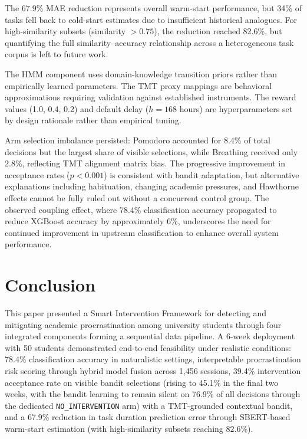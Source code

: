 \documentclass[conference]{IEEEtran}
\begin{document}
The 67.9\% MAE reduction represents overall warm-start performance, but 34\% of tasks fell back to cold-start estimates due to insufficient historical analogues. For high-similarity subsets (similarity $> 0.75$), the reduction reached 82.6\%, but quantifying the full similarity--accuracy relationship across a heterogeneous task corpus is left to future work.

The HMM component uses domain-knowledge transition priors rather than empirically learned parameters. The TMT proxy mappings are behavioral approximations requiring validation against established instruments. The reward values (1.0, 0.4, 0.2) and default delay ($h = 168$ hours) are hyperparameters set by design rationale rather than empirical tuning.

Arm selection imbalance persisted: Pomodoro accounted for 8.4\% of total decisions but the largest share of visible selections, while Breathing received only 2.8\%, reflecting TMT alignment matrix bias. The progressive improvement in acceptance rates ($p < 0.001$) is consistent with bandit adaptation, but alternative explanations including habituation, changing academic pressures, and Hawthorne effects cannot be fully ruled out without a concurrent control group. The observed coupling effect, where 78.4\% classification accuracy propagated to reduce XGBoost accuracy by approximately 6\%, underscores the need for continued improvement in upstream classification to enhance overall system performance.

\section{Conclusion}

This paper presented a Smart Intervention Framework for detecting and mitigating academic procrastination among university students through four integrated components forming a sequential data pipeline. A 6-week deployment with 50 students demonstrated end-to-end feasibility under realistic conditions: 78.4\% classification accuracy in naturalistic settings, interpretable procrastination risk scoring through hybrid model fusion across 1{,}456 sessions, 39.4\% intervention acceptance rate on visible bandit selections (rising to 45.1\% in the final two weeks, with the bandit learning to remain silent on 76.9\% of all decisions through the dedicated \texttt{NO\_INTERVENTION} arm) with a TMT-grounded contextual bandit, and a 67.9\% reduction in task duration prediction error through SBERT-based warm-start estimation (with high-similarity subsets reaching 82.6\%).
\end{document}
